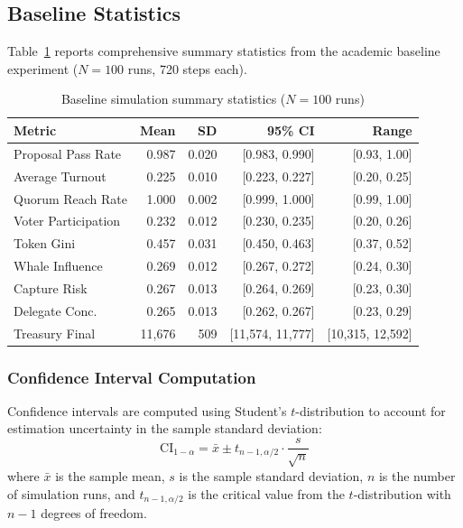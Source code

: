\label{sec:appendix-stats}

\subsection{Baseline Statistics}

Table~\ref{tab:baseline-stats-full} reports comprehensive summary statistics from the academic baseline experiment ($N=100$ runs, 720 steps each).

\begin{table}[htbp]
\centering
\caption{Baseline simulation summary statistics ($N=100$ runs)}
\label{tab:baseline-stats-full}
\small
\begin{tabular}{@{}lrrrr@{}}
\toprule
Metric & Mean & SD & 95\% CI & Range \\
\midrule
Proposal Pass Rate & 0.987 & 0.020 & [0.983, 0.990] & [0.93, 1.00] \\
Average Turnout & 0.225 & 0.010 & [0.223, 0.227] & [0.20, 0.25] \\
Quorum Reach Rate & 1.000 & 0.002 & [0.999, 1.000] & [0.99, 1.00] \\
Voter Participation & 0.232 & 0.012 & [0.230, 0.235] & [0.20, 0.26] \\
Token Gini & 0.457 & 0.031 & [0.450, 0.463] & [0.37, 0.52] \\
Whale Influence & 0.269 & 0.012 & [0.267, 0.272] & [0.24, 0.30] \\
Capture Risk & 0.267 & 0.013 & [0.264, 0.269] & [0.23, 0.30] \\
Delegate Conc. & 0.265 & 0.013 & [0.262, 0.267] & [0.23, 0.29] \\
Treasury Final & 11{,}676 & 509 & [11{,}574, 11{,}777] & [10{,}315, 12{,}592] \\
\bottomrule
\end{tabular}
\end{table}

\subsubsection{Confidence Interval Computation}

Confidence intervals are computed using Student's $t$-distribution to account for estimation uncertainty in the sample standard deviation:
\begin{equation}
\text{CI}_{1-\alpha} = \bar{x} \pm t_{n-1, \alpha/2} \cdot \frac{s}{\sqrt{n}}
\end{equation}
where $\bar{x}$ is the sample mean, $s$ is the sample standard deviation, $n$ is the number of simulation runs, and $t_{n-1, \alpha/2}$ is the critical value from the $t$-distribution with $n-1$ degrees of freedom.

